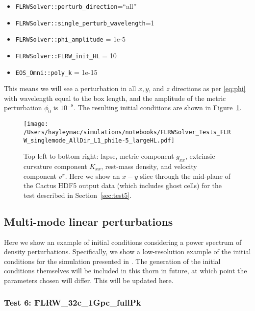 \begin{itemize}
	\item \texttt{FLRWSolver::perturb\_direction}=``all''
	\item \texttt{FLRWSolver::single\_perturb\_wavelength}=1
	\item \texttt{FLRWSolver::phi\_amplitude} = 1e-5
	\item \texttt{FLRWSolver::FLRW\_init\_HL} = 10
	\item \texttt{EOS\_Omni::poly\_k} = 1e-15
\end{itemize}
This means we will see a perturbation in all $x,y$, and $z$ directions as per \eqref{eq:phi} with wavelength equal to the box length, and the amplitude of the metric perturbation $\phi_0$ is $10^{-8}$. The resulting initial conditions are shown in Figure~\ref{fig:test5}. 

\begin{figure}[ht]
	\begin{center}
	   \texttt{[image: /Users/hayleymac/simulations/notebooks/FLRWSolver\_Tests\_FLRW\_singlemode\_AllDir\_L1\_phi1e-5\_largeHL.pdf]}
	\end{center}
	\caption{Top left to bottom right: lapse, metric component $g_{xx}$, extrinsic curvature component $K_{xx}$, rest-mass density, and velocity component $v^x$. Here we show an $x-y$ slice through the mid-plane of the Cactus HDF5 output data (which includes ghost cells) for the test described in Section~\ref{sec:test5}.}
	\label{fig:test5}
\end{figure}




\subsection{Multi-mode linear perturbations}

Here we show an example of initial conditions considering a power spectrum of density perturbations. Specifically, we show a low-resolution example of the initial conditions for the simulation presented in \cite{macpherson2019}. The generation of the initial conditions themselves will be included in this thorn in future, at which point the parameters chosen will differ. This will be updated here. 

\subsubsection{Test 6: FLRW\_32c\_1Gpc\_fullPk} \label{sec:test6}


